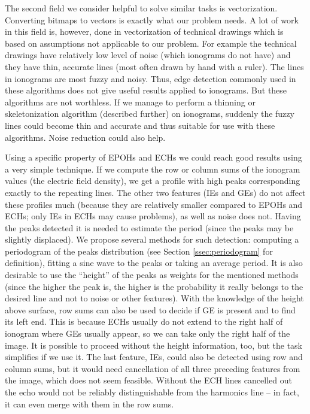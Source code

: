 The second field we consider helpful to solve similar tasks is vectorization. Converting bitmaps to vectors is exactly what our problem needs. A lot of work in this field is, however, done in vectorization of technical drawings which is based on assumptions not applicable to our problem. For example the technical drawings have relatively low level of noise (which ionograms do not have) and they have thin, accurate lines (most often drawn by hand with a ruler). The lines in ionograms are most fuzzy and noisy. Thus, edge detection commonly used in these algorithms does not give useful results applied to ionograms. But these algorithms are not worthless. If we manage to perform a thinning or skeletonization algorithm (described further) on ionograms, suddenly the fuzzy lines could become thin and accurate and thus suitable for use with these algorithms. Noise reduction could also help.

Using a specific property of EPOHs and ECHs we could reach good results using a very simple technique. If we compute the row or column sums of the ionogram values (the electric field density), we get a profile with high peaks corresponding exactly to the repeating lines. The other two features (IEs and GEs) do not affect these profiles much (because they are relatively smaller compared to EPOHs and ECHs; only IEs in ECHs may cause problems), as well as noise does not. Having the peaks detected it is needed to estimate the period (since the peaks may be slightly displaced). We propose several methods for such detection: computing a periodogram of the peaks distribution (see Section \ref{ssec:periodogram} for definition), fitting a sine wave to the peaks or taking an average period. It is also desirable to use the ``height'' of the peaks as weights for the mentioned methods (since the higher the peak is, the higher is the probability it really belongs to the desired line and not to noise or other features). With the knowledge of the height above surface, row sums can also be used to decide if GE is present and to find its left end. This is because ECHs usually do not extend to the right half of ionogram where GEs usually appear, so we can take only the right half of the image. It is possible to proceed without the height information, too, but the task simplifies if we use it. The last feature, IEs, could also be detected using row and column sums, but it would need cancellation of all three preceding features from the image, which does not seem feasible. Without the ECH lines cancelled out the echo would not be reliably distinguishable from the harmonics line -- in fact, it can even merge with them in the row sums.

